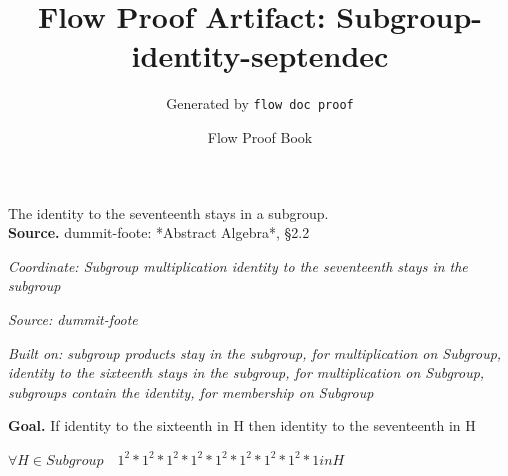 \documentclass[11pt]{article}
\title{Flow Proof Artifact: Subgroup-identity-septendec}
\author{Generated by \texttt{flow doc proof}}
\date{Flow Proof Book}
\theoremstyle{definition}
\begin{document}
\maketitle
The identity to the seventeenth stays in a subgroup.\\[0.5em]
\textbf{Source.} dummit-foote: *Abstract Algebra*, §2.2\\[0.5em]
\bigskip
{}\par
\smallskip\noindent\textit{Coordinate: Subgroup \cdot multiplication \cdot identity to the seventeenth stays in the subgroup}\par
\smallskip\noindent\textit{Source: dummit-foote}\par
\smallskip\noindent\textit{Built on: subgroup products stay in the subgroup, for multiplication on Subgroup, identity to the sixteenth stays in the subgroup, for multiplication on Subgroup, subgroups contain the identity, for membership on Subgroup}\par
\medskip
\noindent\textbf{Goal.} If identity to the sixteenth in H then identity to the seventeenth in H\par
\noindent$\displaystyle \forall H \in Subgroup\quad 1^{2} * 1^{2} * 1^{2} * 1^{2} * 1^{2} * 1^{2} * 1^{2} * 1^{2} * 1 in H$\par
\medskip
\noindent
\end{document}
